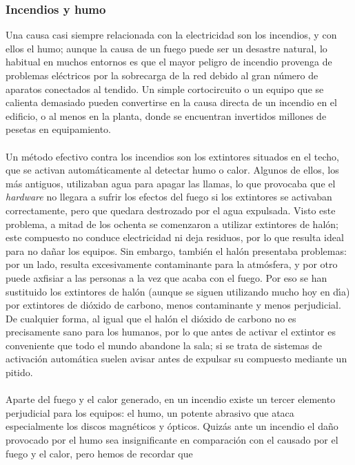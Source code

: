 \subsubsection{Incendios y humo}
Una causa casi siempre relacionada con la electricidad son los incendios, y
con ellos el humo; aunque la causa de un fuego puede ser un desastre natural,
lo habitual en muchos entornos es que el mayor peligro de incendio provenga de
problemas el\'ectricos por la sobrecarga de la red debido al gran n\'umero de
aparatos conectados al tendido. Un simple cortocircuito o un equipo que se
calienta demasiado pueden convertirse en la causa directa de un incendio en
el edificio, o al menos en la planta, donde se encuentran invertidos millones
de pesetas en equipamiento.\\
\\Un m\'etodo efectivo contra los incendios son los extintores situados en el
techo, que se activan autom\'aticamente al detectar humo o calor. Algunos de
ellos, los m\'as antiguos, utilizaban agua para apagar las llamas, lo que 
provocaba que el {\it hardware} no llegara a sufrir los efectos del fuego si
los extintores se activaban correctamente, pero que quedara destrozado por el
agua expulsada. Visto este problema, a mitad de los ochenta se comenzaron a
utilizar extintores de hal\'on; este compuesto no conduce electricidad ni 
deja residuos, por lo que resulta ideal para no da\~nar los equipos. Sin 
embargo, tambi\'en el hal\'on presentaba problemas: por un lado, resulta 
excesivamente contaminante para la atm\'osfera, y por otro puede axfisiar a las
personas a la vez que acaba con el fuego. Por eso se han sustituido los 
extintores de hal\'on (aunque se siguen utilizando mucho hoy en d\'{\i}a) por
extintores de di\'oxido de carbono, menos contaminante y menos perjudicial. De
cualquier forma, al igual que el hal\'on el di\'oxido de carbono no es 
precisamente sano para los humanos, por lo que antes de activar el extintor es
conveniente que todo el mundo abandone la sala; si se trata de sistemas de 
activaci\'on autom\'atica suelen avisar antes de expulsar su compuesto mediante
un pitido.\\
\\Aparte del fuego y el calor generado, en un incendio existe un tercer 
elemento perjudicial para los equipos: el humo, un potente abrasivo que ataca
especialmente los discos magn\'eticos y \'opticos. Quiz\'as ante un incendio el
da\~no provocado por el humo sea insignificante en comparaci\'on con el causado
por el fuego y el calor, pero hemos de recordar que
